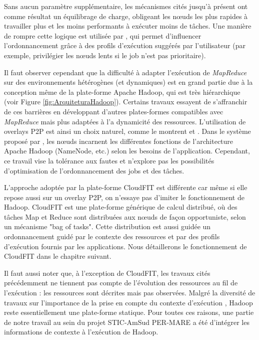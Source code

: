 Sans aucun paramètre supplémentaire, les mécanismes cités jusqu'à présent ont comme résultat un équilibrage de charge, obligeant les n{\oe}uds les plus rapides à travailler plus et les moins performants à exécuter moins de tâches. Une manière de rompre cette logique est utilisée par \cite{Sandholm2010},  qui permet d'influencer l'ordonnancement grâce à des profils d'exécution suggérés par l'utilisateur (par exemple, privilégier les n{\oe}uds lents si le job n'est pas prioritaire).  

Il faut observer cependant que la difficulté à adapter l'exécution de \textit{MapReduce} sur des environnements hétérogènes (et dynamiques) est en grand partie due à la conception même de la plate-forme Apache Hadoop, qui est très hiérarchique (voir Figure \ref{fig:ArquiteturaHadoop}). Certains travaux essayent de s'affranchir de ces barrières en développant d'autres plates-formes compatibles avec \textit{MapReduce} mais plus adaptées à l'a dynamicité des ressources.  L'utilisation de overlays P2P est ainsi un choix naturel, comme le montrent \cite{Marozzo2012} et \cite{Steffenel20151034}. Dans le système proposé par \cite{Marozzo2012}, les n{\oe}uds incarnent les différentes fonctions de l'architecture Apache Hadoop (NameNode, etc.) selon les besoins de l'application. Cependant, ce travail vise la tolérance aux fautes et n'explore pas les possibilités d'optimisation de l'ordonnancement des jobs et des tâches. 

L'approche adoptée par la plate-forme CloudFIT \cite{Steffenel20151034} est différente car même si elle repose aussi sur un overlay P2P, on n'essaye pas d'imiter le fonctionnement de Hadoop. CloudFIT est une plate-forme générique de calcul distribué, où des tâches Map et Reduce sont distribuées aux n{\oe}uds de façon opportuniste, selon un mécanisme "bag of tasks". Cette distribution est aussi guidée un ordonnancement guidé par le contexte des ressources et par des profils d'exécution fournis par les applications. Nous détaillerons le fonctionnement de CloudFIT dans le chapitre suivant.

Il faut aussi noter que, à l'exception de CloudFIT, les travaux cités précédemment ne tiennent pas compte de l'évolution des ressources au fil de l'exécution : les ressources sont décrites mais pas observées. Malgré la diversité de travaux sur l'importance de la prise en compte du contexte d'exécution \cite{Baldauf, Maamar, Ramakrishnan2014, Najar2015}, Hadoop reste essentiellement une plate-forme statique. Pour toutes ces raisons, une partie de notre travail au sein du projet STIC-AmSud PER-MARE a été d'intégrer les informations de contexte à l'exécution de Hadoop.

